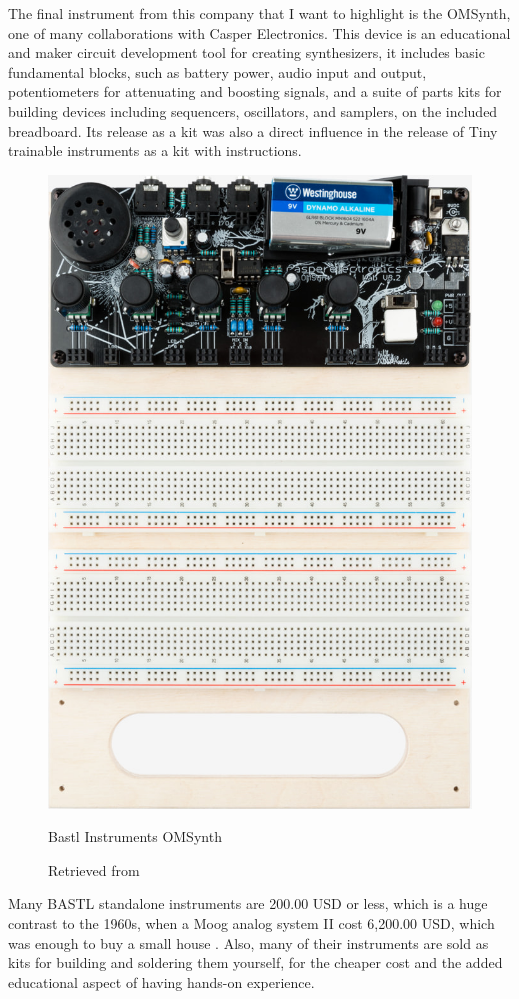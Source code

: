 The final instrument from this company that I want to highlight is the OMSynth, one of many collaborations with Casper Electronics. This device is an educational and maker circuit development tool for creating synthesizers, it includes basic fundamental blocks, such as battery power, audio input and output, potentiometers for attenuating and boosting signals, and a suite of parts kits for building devices including sequencers, oscillators, and samplers, on the included breadboard. Its release as a kit was also a direct influence in the release of Tiny trainable instruments as a kit with instructions.

\begin{figure}[ht]
  \centering
  \includegraphics[width=0.75\linewidth,height=0.25\textheight,keepaspectratio]{images/bastl-omsynth.jpg}
  \caption{Bastl Instruments OMSynth}
  \caption*{Retrieved from \cite{website-bastl-instruments-current}}
  \label{fig:bastl-omsynth}
\end{figure}

Many BASTL standalone instruments are 200.00 USD or less, which is a huge contrast to the 1960s, when a Moog analog system II cost 6,200.00 USD, which was enough to buy a small house \cite{analog-days}. Also, many of their instruments are sold as kits for building and soldering them yourself, for the cheaper cost and the added educational aspect of having hands-on experience.


